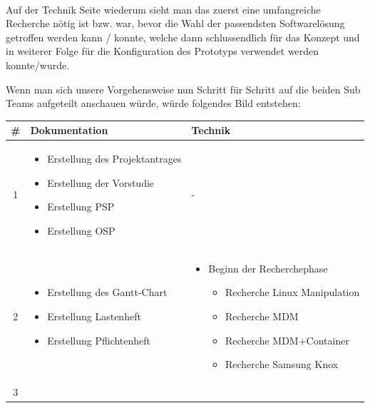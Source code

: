 \paragraph*{}
Auf der Technik Seite wiederum sieht man das zuerst eine umfangreiche Recherche nötig ist bzw. war, bevor die Wahl der passendsten Softwarelösung getroffen werden kann / konnte, welche dann schlussendlich für das Konzept und in weiterer Folge für die Konfiguration des Prototyps verwendet werden konnte/wurde.

\newpage
Wenn man sich unsere Vorgehensweise nun Schritt für Schritt auf die beiden Sub Teams aufgeteilt anschauen würde, würde folgendes Bild entstehen:

\begin{table}
	\centering
	\begin{tabular}{| c | p{6cm} | p{7cm} |}
		\hline
		\textbf \# & \textbf{Dokumentation} & \textbf{Technik}
		\\\hline %
		1 
		&%
		\begin{itemize}
			\item Erstellung des Projektantrages
			\item Erstellung der Vorstudie
			\item Erstellung PSP
			\item Erstellung OSP
		\end{itemize}
		&%
		-
		\\\hline %
		2
		&%
		\begin{itemize}
			\item Erstellung des Gantt-Chart
			\item Erstellung Lastenheft
			\item Erstellung Pflichtenheft
		\end{itemize}
		&%
		\begin{itemize}
			\item Beginn der Recherchephase
			\begin{itemize}
				\item Recherche Linux Manipulation
				\item Recherche MDM
				\item Recherche MDM+Container
				\item Recherche Samsung Knox
			\end{itemize}
		\end{itemize}
		\\\hline %
		3
		&%
		\begin{itemize}

\end{itemize}
\end{tabular}
\end{table}
